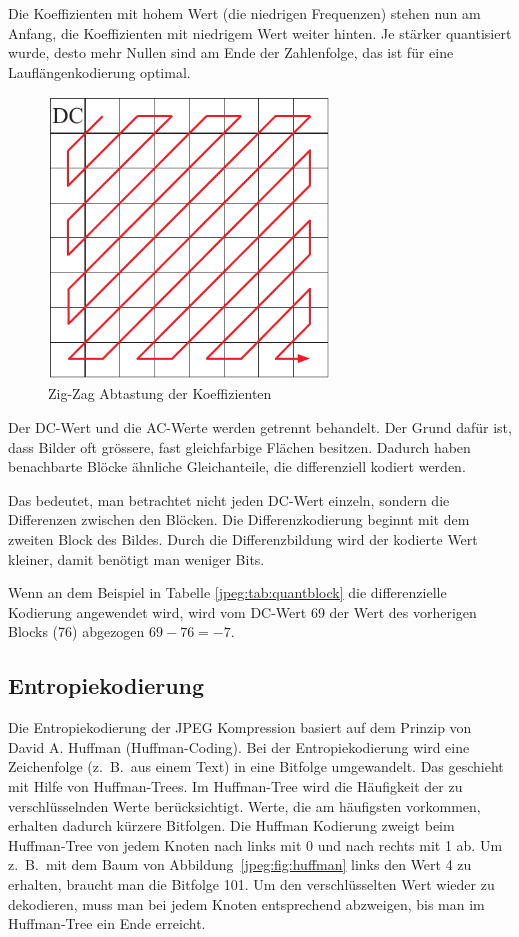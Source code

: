 Die Koeffizienten mit hohem Wert (die niedrigen Frequenzen) stehen nun am Anfang, die Koeffizienten mit niedrigem Wert weiter hinten.
Je stärker quantisiert wurde, desto mehr Nullen sind am Ende der Zahlenfolge, das ist für eine Lauflängenkodierung optimal.

\begin{figure}
    \centering
    \includegraphics[width=75mm]{papers/jpeg/pictures/zigzag.pdf}
    \caption{Zig-Zag Abtastung der Koeffizienten
        \label{jpeg:fig:zigzag}}
\end{figure}

Der DC-Wert und die AC-Werte werden getrennt behandelt.
Der Grund dafür ist, dass Bilder oft grössere, fast gleichfarbige Flächen besitzen.
Dadurch haben benachbarte Blöcke ähnliche Gleichanteile, die differenziell kodiert werden.

Das bedeutet, man betrachtet nicht jeden DC-Wert einzeln, sondern die Differenzen zwischen den Blöcken.
Die Differenzkodierung beginnt mit dem zweiten Block des Bildes.
Durch die Differenzbildung wird der kodierte Wert kleiner, damit benötigt man weniger Bits.

\begin{beispiel}
\label{jpeg:beispie:differenzcodierung}
Wenn an dem Beispiel in Tabelle \ref{jpeg:tab:quantblock} die differenzielle Kodierung angewendet wird, wird vom DC-Wert 69 der Wert des vorherigen Blocks (76) abgezogen \(69-76 = -7\).
\end{beispiel}


\subsection{Entropiekodierung
\label{jpeg:subsection:entropiekodierung}}
Die Entropiekodierung der JPEG Kompression basiert auf dem Prinzip von David A. Huffman (Huffman-Coding).
%
Bei der Entropiekodierung wird eine Zeichenfolge (z.~B.~aus einem Text) in eine Bitfolge umgewandelt.
Das geschieht mit Hilfe von Huffman-Trees.
Im Huffman-Tree wird die Häufig\-keit der zu verschlüsselnden Werte berücksichtigt.
Werte, die am häufigsten vorkommen, erhalten dadurch kürzere Bitfolgen.
Die Huffman Kodierung zweigt beim Huffman-Tree von jedem Knoten nach links mit 0 und nach rechts mit 1 ab.
Um z.~B.~mit dem Baum von Abbildung~\ref{jpeg:fig:huffman} links den Wert 4 zu erhalten, braucht man die Bitfolge 101.
Um den verschlüsselten Wert wieder zu dekodieren, muss man bei jedem Knoten entsprechend abzweigen, bis man im Huffman-Tree ein Ende erreicht.

